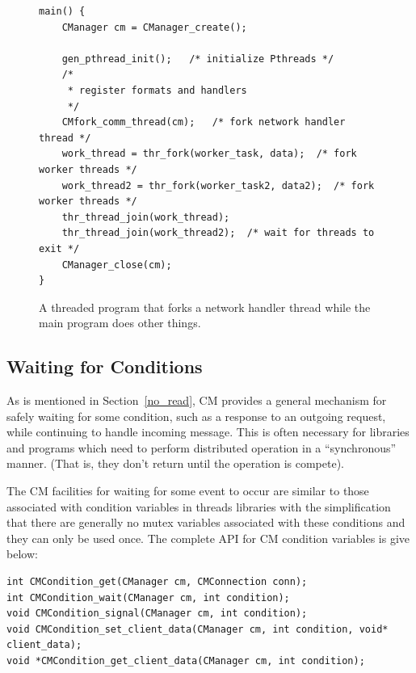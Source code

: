 \documentclass[11pt]{article}
\begin{document}
\begin{figure}
\center\begin{BVerbatim}
main() {
    CManager cm = CManager_create();

    gen_pthread_init();   /* initialize Pthreads */
    /*
     * register formats and handlers
     */
    CMfork_comm_thread(cm);   /* fork network handler thread */
    work_thread = thr_fork(worker_task, data);  /* fork worker threads */
    work_thread2 = thr_fork(worker_task2, data2);  /* fork worker threads */
    thr_thread_join(work_thread);
    thr_thread_join(work_thread2);  /* wait for threads to exit */
    CManager_close(cm);
}
\end{BVerbatim}
\caption{A threaded program that forks a network handler thread while the
main program does other things.\label{fork_example}\label{last_example}} 
\end{figure}

\subsection{Waiting for Conditions\label{sec:conditions}}

As is mentioned in Section~\ref{no_read}, CM provides a general mechanism
for safely waiting for some condition, such as a response to an outgoing
request, while continuing to handle incoming message.  This is often
necessary for libraries and programs which need to perform distributed
operation in a ``synchronous'' manner.  (That is, they don't return until
the operation is compete).

The CM facilities for waiting for some event to occur are similar
to those associated with condition variables in threads libraries with the
simplification that there are generally no mutex variables associated with
these conditions and they can only be used once.  The complete API for
CM condition variables is give below:

\begin{BVerbatim}
int CMCondition_get(CManager cm, CMConnection conn);
int CMCondition_wait(CManager cm, int condition);
void CMCondition_signal(CManager cm, int condition);
void CMCondition_set_client_data(CManager cm, int condition, void* client_data);
void *CMCondition_get_client_data(CManager cm, int condition);
\end{BVerbatim}
\end{document}
